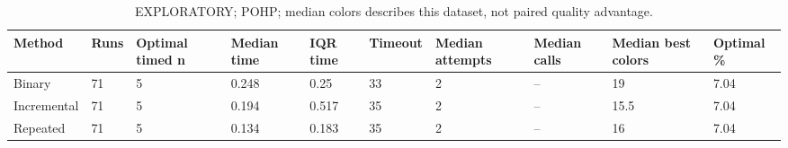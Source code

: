 \begin{table}[htbp]
\centering
\caption{EXPLORATORY; POHP; median colors describes this dataset, not paired quality advantage.}
\label{tab:p2a-POHP-exploratory-methods}
\begin{tabular}{llllllllll}
\hline
Method & Runs & Optimal timed n & Median time & IQR time & Timeout & Median attempts & Median calls & Median best colors & Optimal \% \\
\hline
Binary & 71 & 5 & 0.248 & 0.25 & 33 & 2 & -- & 19 & 7.04 \\
Incremental & 71 & 5 & 0.194 & 0.517 & 35 & 2 & -- & 15.5 & 7.04 \\
Repeated & 71 & 5 & 0.134 & 0.183 & 35 & 2 & -- & 16 & 7.04 \\
\hline
\end{tabular}
\end{table}
